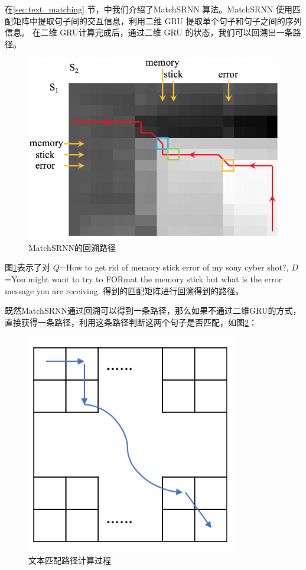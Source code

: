 在\ref{sec:text_matching} 节，中我们介绍了MatchSRNN\cite{Wan2016MatchSRNNMT} 算法。MatchSRNN 使用匹配矩阵中提取句子间的交互信息，利用二维 GRU 提取单个句子和句子之间的序列信息。 在二维 GRU计算完成后，通过二维 GRU 的状态，我们可以回溯出一条路径。
\begin{figure}[!htbp]\centering
\vspace{1em}
  \includegraphics[width=0.65\linewidth]{figures/LD_dis}
  \caption{MatchSRNN的回溯路径}
  \label{fig:LD_dis}       %
  \vspace{1em}
\end{figure}


图\ref{fig:LD_dis}表示了对 $Q$=How to get rid of memory stick error of my sony cyber shot?, $D$=You might want to try to FORmat the memory
stick but what is the error message you are receiving. 得到的匹配矩阵进行回溯得到的路径。



既然MatchSRNN通过回溯可以得到一条路径，那么如果不通过二维GRU的方式，直接获得一条路径，利用这条路径判断这两个句子是否匹配，如图\ref{fig:match_MDP}：

\begin{figure}[!htbp]\centering
\vspace{1em}
  \includegraphics[width=0.4\linewidth]{figures/match_MDP}
  \caption{文本匹配路径计算过程}
  \label{fig:match_MDP}       %
  \vspace{1em}
\end{figure}

